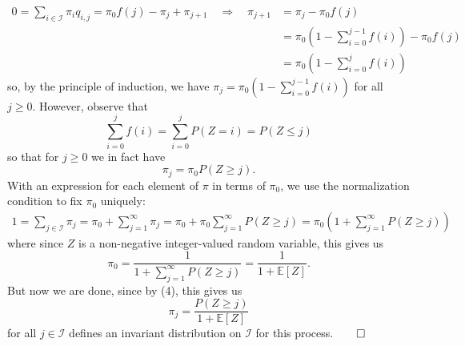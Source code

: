 \documentclass[11pt, letterpaper]{article}
\newcommand{\mbb}[1]{\mathbb{#1}}
\newcommand{\mc}[1]{\mathcal{#1}}
\begin{document}
    \begin{align*}
        0=\sum_{i\in\mc{I}}\pi_iq_{i,j}=\pi_0f(j)-\pi_{j}+\pi_{j+1}\quad\Rightarrow\quad \pi_{j+1}&=\pi_j-\pi_0f(j)\\
        &=\pi_0\left(1-\sum_{i=0}^{j-1}f(i)\right)-\pi_0f(j)\\
        &=\pi_0\left(1-\sum_{i=0}^jf(i)\right)
    \end{align*}
    so, by the principle of induction, we have $\pi_j=\pi_0(1-\sum_{i=0}^{j-1}f(i))$ for all $j\geq 0$. However, observe that
    \[\sum_{i=0}^{j}f(i)=\sum_{i=0}^{j}P(Z=i)=P(Z\leq j)\]
    so that for $j\geq 0$ we in fact have
    \[\pi_j=\pi_0P(Z\geq j).\tag{4}\]
    With an expression for each element of $\pi$ in terms of $\pi_0$, we use the normalization condition to fix $\pi_0$ uniquely:
    \begin{align*}
       1=\sum_{j\in\mc{I}}\pi_j=\pi_0+\sum_{j=1}^\infty\pi_j=\pi_0+\pi_0\sum_{j=1}^\infty P(Z\geq j)=\pi_0\left(1+\sum_{j=1}^\infty P(Z\geq j)\right)
    \end{align*}
    where since $Z$ is a non-negative integer-valued random variable, this gives us
    \[\pi_0=\frac{1}{1+\sum_{j=1}^\infty P(Z\geq j)}=\frac{1}{1+\mbb{E}[Z]}.\]
    But now we are done, since by (4), this gives us
    \[\pi_j=\frac{P(Z\geq j)}{1+\mbb{E}[Z]}\]
    for all $j\in\mc{I}$ defines an invariant distribution on $\mc{I}$ for this process.\hfill{$\qed$}\\[10pt]
\end{document}
